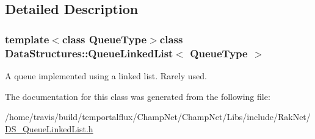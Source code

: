 \subsection{Detailed Description}
\subsubsection*{template$<$class Queue\-Type$>$class Data\-Structures\-::\-Queue\-Linked\-List$<$ Queue\-Type $>$}

A queue implemented using a linked list. Rarely used. 

The documentation for this class was generated from the following file\-:\begin{DoxyCompactItemize}
\item 
/home/travis/build/temportalflux/\-Champ\-Net/\-Champ\-Net/\-Libs/include/\-Rak\-Net/\hyperlink{_d_s___queue_linked_list_8h}{D\-S\-\_\-\-Queue\-Linked\-List.\-h}\end{DoxyCompactItemize}
